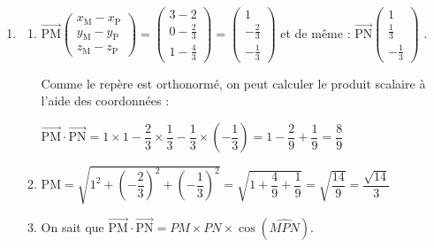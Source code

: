 \documentclass[10pt]{article}
\providecommand{\vect}[1]{\overrightarrow{#1}}
\begin{document}
\begin{enumerate}
	$\begin{aligned} M_t \in (\mathrm{BCF}) &\iff x_{M_t} = 2\\
	&\iff 3t=2\\
	&\iff t = \dfrac{2}{3}\\ \end{aligned}$

	P est donc $M_{\frac{2}{3}}$ sur la droite (HM), il a donc comme coordonnées :

$x_P=2$, $y_P=2-2\times \dfrac{2}{3}=\dfrac{6}{3}-\dfrac{4}{3}=\dfrac{2}{3}$ et $z_P=2-\dfrac{2}{3}=\dfrac{6}{3}-\dfrac{2}{3}=\dfrac{4}{3}$ .

Cela confirme P$\left(2~;~\dfrac{2}{3} ~;~\dfrac{4}{3}\right) $

\item 
	\begin{enumerate}
		\item $\vect{\mathrm{PM}}\begin{pmatrix} x_\mathrm{M}-x_\mathrm{P}\\y_\mathrm{M}-y_\mathrm{P}\\z_\mathrm{M}-z_\mathrm{P} \end{pmatrix} = \begin{pmatrix} 3-2\\0-\frac{2}{3}\\1-\frac{4}{3}\end{pmatrix}= \begin{pmatrix} 1\\-\frac{2}{3}\\-\frac{1}{3}\end{pmatrix}$ \quad et de même : $\vect{\mathrm{PN}} \begin{pmatrix} 1\\\frac{1}{3}\\-\frac{1}{3}\end{pmatrix}$ .

Comme le repère est orthonormé, on peut calculer le produit scalaire à l'aide des coordonnées :

$ \vect{\mathrm{PM}}\cdot \vect{\mathrm{PN}} = 1\times 1  -\dfrac{2}{3} \times \dfrac{1}{3} -\dfrac{1}{3} \times \left(-\dfrac{1}{3}\right) = 1 -\dfrac{2}{9}+\dfrac{1}{9} = \dfrac{8}{9}$

		\item $\mathrm{PM}=\sqrt{1^2+{\left(-\dfrac{2}{3}   \right)}^2 +{\left(-\dfrac{1}{3}   \right)}^2} =\sqrt{1+\dfrac{4}{9}+\dfrac{1}{9}}=\sqrt{\dfrac{14}{9}}=\dfrac{\sqrt{14}}{3}$

		\item On sait que $\vect{\mathrm{PM}}\cdot \vect{\mathrm{PN}}=PM \times PN \times \cos\left( \widehat{MPN}\right)$.


\end{enumerate}
\end{enumerate}
\end{document}
